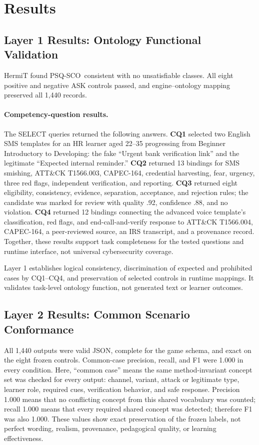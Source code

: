 \documentclass[runningheads]{llncs}
\newcommand{\sco}{PSQ-SCO}
\begin{document}
\section{Results}

\subsection{Layer 1 Results: Ontology Functional Validation}

HermiT found \sco\ consistent with no unsatisfiable classes. All eight positive
and negative ASK controls passed, and engine--ontology mapping preserved all 1,440
records.

\paragraph{Competency-question results.}
The SELECT queries returned the following answers. \textbf{CQ1} selected two
English SMS templates for an HR learner aged 22--35 progressing from Beginner
Introductory to Developing: the fake ``Urgent bank verification link'' and the
legitimate ``Expected internal reminder.'' \textbf{CQ2} returned 13 bindings for
SMS smishing, ATT\&CK T1566.003, CAPEC-164, credential harvesting, fear, urgency,
three red flags, independent verification, and reporting. \textbf{CQ3} returned
eight eligibility, consistency, evidence, separation, acceptance, and rejection
rules; the candidate was marked for review with quality .92, confidence .88, and
no violation. \textbf{CQ4} returned 12 bindings connecting the advanced voice
template's classification, red flags, and end-call-and-verify response to ATT\&CK
T1566.004, CAPEC-164, a peer-reviewed source, an IRS transcript, and a provenance
record. Together, these results support task completeness for the tested questions
and runtime interface, not universal cybersecurity coverage.

Layer 1 establishes logical consistency, discrimination of expected and
prohibited cases by CQ1--CQ4, and preservation of selected controls in runtime
mappings. It validates task-level ontology function, not generated text or learner
outcomes.

\subsection{Layer 2 Results: Common Scenario Conformance}
\label{subsection:diag}

All 1,440 outputs were valid JSON, complete for the game schema, and exact on the
eight frozen controls. Common-case precision, recall, and F1 were 1.000 in every
condition. Here, ``common case'' means the same method-invariant concept set was
checked for every output: channel, variant, attack or legitimate type, learner
role, required cues, verification behavior, and safe response. Precision 1.000
means that no conflicting concept from this shared vocabulary was counted; recall
1.000 means that every required shared concept was detected; therefore F1 was
also 1.000. These values show exact preservation of the frozen labels, not perfect
wording, realism, provenance, pedagogical quality, or learning effectiveness.
\end{document}

